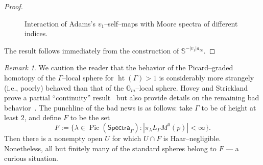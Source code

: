 \documentclass{amsart}
\renewcommand{\S}{\mathbb S}
\newcommand{\G}{\mathbb G}
\newcommand{\<}{\langle}
\renewcommand{\>}{\rangle}
\newcommand{\CatOf}[1]{\mathsf{#1}}
\DeclareMathOperator{\Pic}{Pic}
\theoremstyle{plain}
\theoremstyle{definition}
\theoremstyle{remark}
\newtheorem*{remark}{Remark}
\begin{document}
\begin{proof}
\begin{sidewaysfigure}[ht]
\begin{center}
\end{center}
\caption{Interaction of Adams's $v_1$--self--maps with Moore spectra of different indices.}
\label{SelfMapFigure}
\end{sidewaysfigure}
The result follows immediately from the construction of $\S^{-|v_1| a_\infty}$.
\end{proof}

\begin{remark}
We caution the reader that the behavior of the Picard--graded homotopy of the $\Gamma$--local sphere for $\operatorname{ht}(\Gamma) > 1$ is considerably more strangely (i.e., poorly) behaved than that of the $\G_m$--local sphere.  Hovey and Strickland prove a partial ``continuity'' result~\cite[Proposition 14.6]{HoveyStrickland} but also provide details on the remaining bad behavior~\cite[Theorem 15.1]{HoveyStrickland}.  The punchline of the bad news is as follows: take $\Gamma$ to be of height at least $2$, and define $F$ to be the set \[F := \{\lambda \in \Pic(\CatOf{Spectra}_\Gamma) : |\pi_\lambda L_{\Gamma} M^0(p)| < \infty\}.\] Then there is a nonempty open $U$ for which $U \cap F$ is Haar--negligible.  Nonetheless, all but finitely many of the standard spheres belong to $F$ --- a curious situation.
\end{remark}
\end{document}

